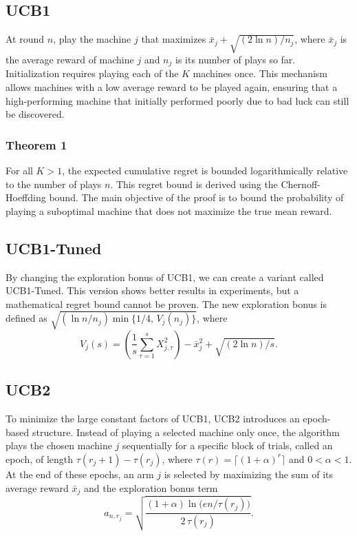 \documentclass[10pt]{article}
\begin{document}
\subsection{UCB1}
At round $n$, play the machine $j$ that maximizes $\bar{x}_{j}+\sqrt{(2\ln n)/n_{j}}$, where $\bar{x}_{j}$ is the average reward of
machine $j$ and $n_{j}$ is its number of plays so far. Initialization requires playing each of the $K$ machines once.
This mechanism allows machines with a low average reward to be played again, ensuring that a
high-performing machine that initially performed poorly due to bad luck can still be discovered.

\subsubsection{Theorem 1}
For all $K>1$, the expected cumulative regret is bounded logarithmically relative to the number of plays
$n$. This regret bound is derived using the Chernoff-Hoeffding bound. The main objective of the proof is to
bound the probability of playing a suboptimal machine that does not maximize the true mean reward.

\subsection{UCB1-Tuned}
By changing the exploration bonus of UCB1, we can create a variant called UCB1-Tuned. This version
shows better results in experiments, but a mathematical regret bound cannot be proven. The new exploration
bonus is defined as $\sqrt{(\ln n/n_{j})\min\{1/4,\,V_{j}(n_{j})\}}$, where
\[
V_{j}(s)=\left(\frac{1}{s}\sum_{\tau=1}^{s}X_{j,\tau}^{2}\right)-\bar{x}_{j}^{2}+\sqrt{(2\ln n)/s}.
\]

\subsection{UCB2}
To minimize the large constant factors of UCB1, UCB2 introduces an epoch-based structure. Instead of
playing a selected machine only once, the algorithm plays the chosen machine $j$ sequentially for a specific
block of trials, called an epoch, of length $\tau(r_{j}+1)-\tau(r_{j})$, where $\tau(r)=\lceil(1+\alpha)^{r}\rceil$ and $0<\alpha<1$. At
the end of these epochs, an arm $j$ is selected by maximizing the sum of its average reward $\bar{x}_{j}$ and the
exploration bonus term
\[
a_{n,r_{j}}=\sqrt{\frac{(1+\alpha)\ln\!\big(en/\tau(r_{j})\big)}{2\,\tau(r_{j})}}.
\]
\end{document}
